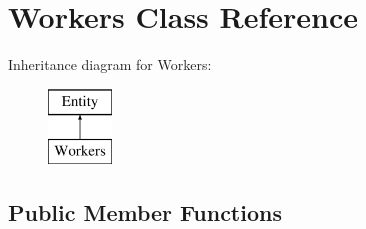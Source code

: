 \hypertarget{class_workers}{}\section{Workers Class Reference}
\label{class_workers}
Inheritance diagram for Workers\+:\begin{figure}[H]
\begin{center}
\leavevmode
\includegraphics[height=2.000000cm]{class_workers}
\end{center}
\end{figure}
\subsection*{Public Member Functions}
